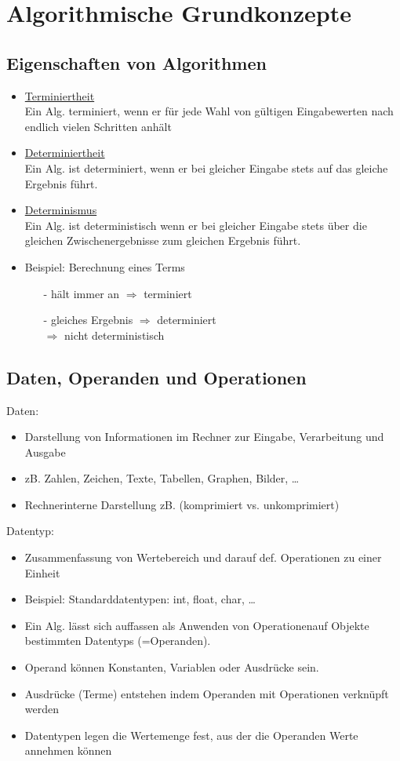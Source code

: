 \section{Algorithmische Grundkonzepte}
 \subsection{Eigenschaften von Algorithmen}
  \begin{itemize}
   \item \underline{Terminiertheit} \\
    Ein Alg. terminiert, wenn er für jede Wahl von gültigen Eingabewerten nach endlich vielen Schritten anhält
   \item \underline{Determiniertheit} \\
    Ein Alg. ist determiniert, wenn er bei gleicher Eingabe stets auf das gleiche Ergebnis führt.
   \item \underline{Determinismus} \\
    Ein Alg. ist deterministisch wenn er bei gleicher Eingabe stets über die gleichen Zwischenergebnisse zum gleichen Ergebnis führt.
    \item Beispiel: Berechnung eines Terms
    \begin{itemize}
     \item[-] hält immer an $\Rightarrow$ terminiert
     \item[-] gleiches Ergebnis $\Rightarrow$ determiniert \\
      $\Rightarrow$ nicht deterministisch
    \end{itemize}
   \end{itemize}
 \subsection{Daten, Operanden und Operationen}
 Daten:
 \begin{itemize}
 \item Darstellung von Informationen im Rechner zur Eingabe, Verarbeitung und Ausgabe
 \item zB. Zahlen, Zeichen, Texte, Tabellen, Graphen, Bilder, \dots
 \item Rechnerinterne Darstellung zB. (komprimiert vs. unkomprimiert)
 \end{itemize}
 Datentyp:
 \begin{itemize}
  \item Zusammenfassung von Wertebereich und darauf def. Operationen zu einer Einheit
  \item Beispiel: Standarddatentypen: int, float, char, \dots
  \item Ein Alg. lässt sich auffassen als Anwenden von Operationenauf Objekte bestimmten Datentyps (=Operanden).
  \item Operand können Konstanten, Variablen oder Ausdrücke sein.
  \item Ausdrücke (Terme) entstehen indem Operanden mit Operationen verknüpft werden
  \item Datentypen legen die Wertemenge fest, aus der die Operanden Werte annehmen können
 \end{itemize}